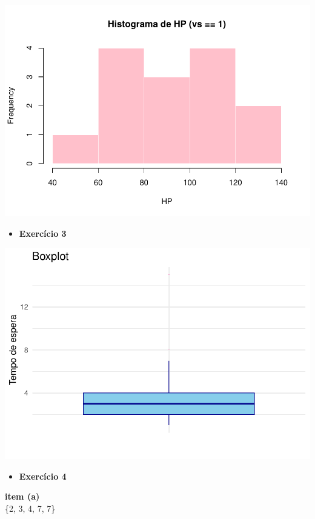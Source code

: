 \documentclass[
]{book}
\providecommand{\tightlist}{%
  \setlength{\itemsep}{0pt}\setlength{\parskip}{0pt}}
\begin{document}
\begin{center}\includegraphics{AED_files/figure-latex/cap6_ex2_vs1-1} \end{center}

\begin{itemize}
\tightlist
\item
  \textbf{Exercício 3}
\end{itemize}

\begin{center}\includegraphics{AED_files/figure-latex/cap6_e3-1} \end{center}

\begin{itemize}
\tightlist
\item
  \textbf{Exercício 4}
\end{itemize}

\textbf{item (a)}\\
\{2, 3, 4, 7, 7\}
\end{document}
